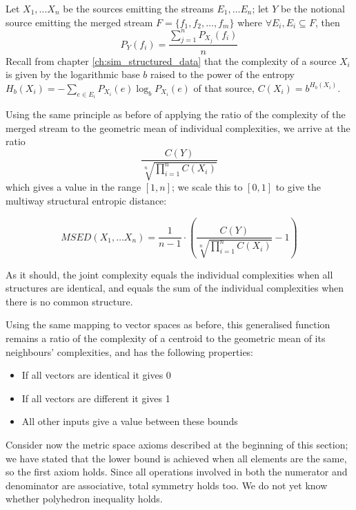 Let $X_1, \ldots X_n$ be the sources emitting the streams $E_1, \ldots E_n$; let $Y$ be the notional source emitting the merged stream $F = \{f_1, f_2, \ldots, f_m\}$ where $\forall E_i,  E_i \subseteq F$, then  
\begin{equation}
	P_Y(f_i) = \frac{\sum_{j=1}^n P_{X_j}(f_i)}{n}
\end{equation}
Recall from chapter \ref{ch:sim_structured_data} that the complexity of a source $X_i$ is given by the logarithmic base $b$ raised to the power of the entropy $H_b(X_i) = -\sum_{e \in E_i} P_{X_i}(e) \log_b P_{X_i}(e)$ of that source, $C(X_i) = b^{H_b(X_i)}$.  

Using the same principle as before of applying the ratio of the complexity of the merged stream to the geometric mean of individual complexities, we arrive at the ratio 
\begin{equation}
\frac{C(Y)}{\sqrt[n]{\prod_{i=1}^n C(X_i)}}
\end{equation}
which gives a value in the range $[1, n]$; we scale this to $[0,1]$ to give the multiway structural entropic distance:

\begin{equation}
MSED(X_1, \ldots X_n) = \frac{1}{n - 1} \cdot \left(\frac{C(Y)}{\sqrt[n]{\prod_{i=1}^n C(X_i)}} - 1\right)
\end{equation}

As it should, the joint complexity equals the individual complexities when all structures are identical, and equals the sum of the individual
complexities when there is no common structure.

Using the same mapping to vector spaces as before, this generalised function remains a ratio of the complexity of a centroid to the geometric mean of its neighbours' complexities, and has the following properties:  
\begin{itemize}
\item If all vectors are identical it gives 0
\item If all vectors are different it gives 1
\item All other inputs give a value between these bounds
\end{itemize}

Consider now the metric space axioms described at the beginning of this section; we have stated that the lower bound is achieved when all elements are the same, so the first axiom holds.  Since all operations involved in both the numerator and denominator are associative, total symmetry holds too. We do not yet know whether polyhedron inequality holds. 
